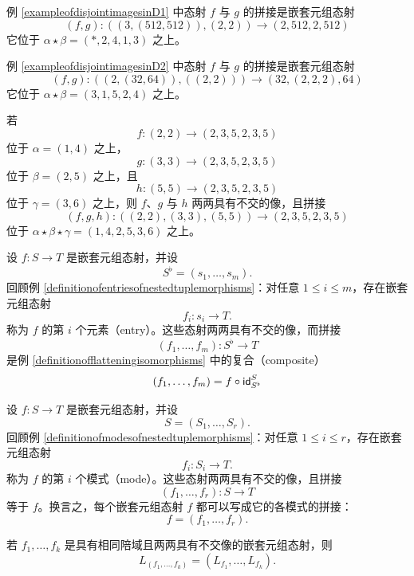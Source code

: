 \begin{example} 例 \ref{exampleofdisjointimagesinD1} 中态射 $f$ 与 $g$ 的拼接是嵌套元组态射
\[(f,g): \left((3,(512,512)),(2,2)\right) \to (2,512,2,512)\]
它位于 $\alpha \star \beta = (*,2,4,1,3)$ 之上。
\end{example}

\begin{example} 例 \ref{exampleofdisjointimagesinD2} 中态射 $f$ 与 $g$ 的拼接是嵌套元组态射
\[(f,g): ( (2,(32,64)),((2,2))) \to (32,(2,2,2),64)\]
它位于 $\alpha \star \beta = (3,1,5,2,4)$ 之上。
\end{example}

\begin{example}
    若
    \[
    f:(2,2) \to (2,3,5,2,3,5)
    \]
    位于 $\alpha = (1,4)$ 之上，
    \[
    g:(3,3) \to (2,3,5,2,3,5)
    \]
    位于 $\beta = (2,5)$ 之上，且
    \[
    h: (5,5) \to (2,3,5,2,3,5)
    \]
    位于 $\gamma = (3,6)$ 之上，则 $f$、$g$ 与 $h$ 两两具有不交的像，且拼接
    \[
    (f,g,h):((2,2),(3,3),(5,5)) \to (2,3,5,2,3,5)
    \]
    位于 $\alpha \star \beta \star \gamma = (1,4,2,5,3,6)$ 之上。
\end{example}

\begin{example}
设 $f:S \to T$ 是嵌套元组态射，并设
\[
S^\flat = (s_1,\dots,s_m).
\]
回顾例 \ref{definitionofentriesofnestedtuplemorphisms}：对任意 $1 \leq i \leq m$，存在嵌套元组态射
\[
f_i:s_i \to T.
\]
称为 $f$ 的第 $i$ 个元素（entry）。这些态射两两具有不交的像，而拼接
\[
(f_1,\dots,f_m):S^\flat \to T
\]
是例 \ref{definitionofflatteningisomorphisms} 中的复合（composite）
\[
(f_1,\dots,f_m) = f \circ \mathsf{id}_{S^\flat}^S
\]
\end{example}

\begin{example}
设 $f:S \to T$ 是嵌套元组态射，并设
\[
S = (S_1,\dots,S_r).
\]
回顾例 \ref{definitionofmodesofnestedtuplemorphisms}：对任意 $1 \leq i \leq r$，存在嵌套元组态射
\[
f_i:S_i \to T.
\]
称为 $f$ 的第 $i$ 个模式（mode）。这些态射两两具有不交的像，且拼接
\[
(f_1,\dots,f_r):S \to T
\]
等于 $f$。换言之，每个嵌套元组态射 $f$ 都可以写成它的各模式的拼接：
\[f = (f_1,\dots,f_r).\]
\end{example}




\begin{proposition}\label{compatibilityofconcatenateinD}
    若 $f_1,\dots,f_k$ 是具有相同陪域且两两具有不交像的嵌套元组态射，则
    \[
    L_{(f_1,\dots,f_k)} = (L_{f_1},\dots,L_{f_k}).
    \]
\end{proposition}

